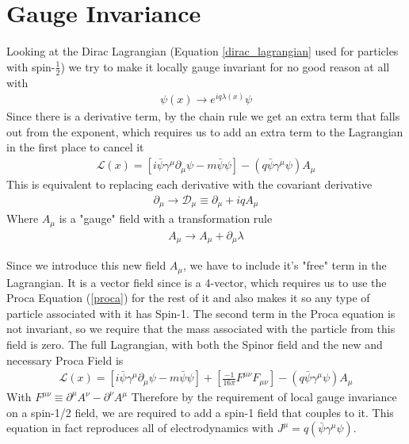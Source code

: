 \section{Gauge Invariance}\label{gauge-inv}
Looking at the Dirac Lagrangian (Equation \ref{dirac_lagrangian} used for particles with spin-$\frac{1}{2}$) we try to make it locally gauge invariant for no good reason at all\cite{griffiths_ep} with
\begin{align}
\psi(x) \rightarrow e^{iq\lambda(x)}\psi
\end{align}
Since there is a derivative term, by the chain rule we get an extra term that falls out from the exponent, which requires us to add an extra term to the Lagrangian in the first place to cancel it
\begin{align}
    \mathcal{L}(x) = [i\bar{\psi}\gamma^\mu\partial_\mu\psi - m\bar{\psi}\psi] - (q\bar{\psi}\gamma^\mu\psi)A_\mu
\end{align}
This is equivalent to replacing each derivative with the covariant derivative
\begin{align}
\partial_\mu \rightarrow \mathcal{D}_\mu \equiv \partial_\mu +iqA_\mu
\end{align}
Where $A_\mu$ is a "gauge" field with a transformation rule
\begin{align}\label{gauge-transform}
A_\mu \rightarrow A_\mu + \partial_\mu\lambda
\end{align}

Since we introduce this new field $A_\mu$, we have to include it's "free" term in the Lagrangian. It is a vector field since is a 4-vector, which requires us to use the Proca Equation (\ref{proca}) for the rest of it and also makes it so any type of particle associated with it has Spin-1. The second term in the Proca equation is not invariant, so we require that the mass associated with the particle from this field is zero. The full Lagrangian, with both the Spinor field and the new and necessary Proca Field is
\begin{align}
\mathcal{L}(x) = [i\bar{\psi}\gamma^\mu\partial_\mu\psi - m\bar{\psi}\psi] + \left[\frac{-1}{16\pi}F^{\mu\nu}F_{\mu\nu}\right]- (q\bar{\psi}\gamma^\mu\psi)A_\mu
\end{align}
With $F^{\mu\nu}\equiv \partial^\mu A^\nu - \partial^\nu A^\mu$ Therefore by the requirement of local gauge invariance on a spin-1/2 field, we are required to add a spin-1 field that couples to it. This equation in fact reproduces all of electrodynamics with $J^\mu = q(\bar{\psi}\gamma^\mu\psi)$.

